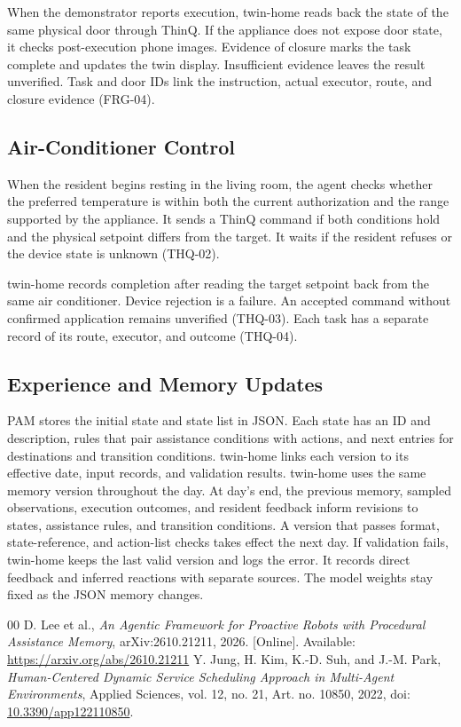 \documentclass[conference,a4paper]{IEEEtran}
\begin{document}
When the demonstrator reports execution, twin-home reads back the state of the same physical door through ThinQ. If the appliance does not expose door state, it checks post-execution phone images. Evidence of closure marks the task complete and updates the twin display. Insufficient evidence leaves the result unverified. Task and door IDs link the instruction, actual executor, route, and closure evidence (FRG-04).

\subsection{Air-Conditioner Control}

When the resident begins resting in the living room, the agent checks whether the preferred temperature is within both the current authorization and the range supported by the appliance. It sends a ThinQ command if both conditions hold and the physical setpoint differs from the target. It waits if the resident refuses or the device state is unknown (THQ-02).

twin-home records completion after reading the target setpoint back from the same air conditioner. Device rejection is a failure. An accepted command without confirmed application remains unverified (THQ-03). Each task has a separate record of its route, executor, and outcome (THQ-04).

\subsection{Experience and Memory Updates}

PAM stores the initial state and state list in JSON. Each state has an ID and description, rules that pair assistance conditions with actions, and next entries for destinations and transition conditions. twin-home links each version to its effective date, input records, and validation results. twin-home uses the same memory version throughout the day. At day's end, the previous memory, sampled observations, execution outcomes, and resident feedback inform revisions to states, assistance rules, and transition conditions. A version that passes format, state-reference, and action-list checks takes effect the next day. If validation fails, twin-home keeps the last valid version and logs the error. It records direct feedback and inferred reactions with separate sources. The model weights stay fixed as the JSON memory changes.

\begin{thebibliography}{00}
 D. Lee et al., \emph{An Agentic Framework for Proactive Robots with Procedural Assistance Memory}, arXiv:2610.21211, 2026. [Online]. Available: \url{https://arxiv.org/abs/2610.21211}
 Y. Jung, H. Kim, K.-D. Suh, and J.-M. Park, \emph{Human-Centered Dynamic Service Scheduling Approach in Multi-Agent Environments}, Applied Sciences, vol. 12, no. 21, Art. no. 10850, 2022, doi: \href{https://doi.org/10.3390/app122110850}{10.3390/app122110850}.
\end{thebibliography}
\end{document}
